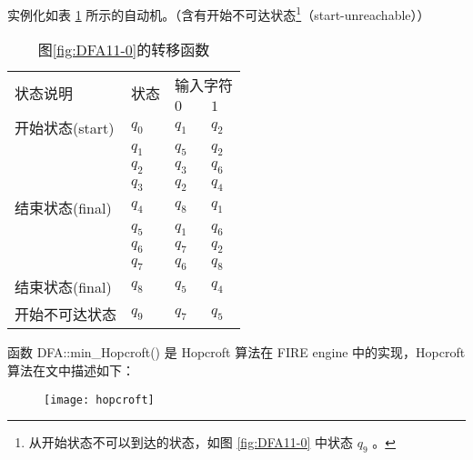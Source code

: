实例化如表 \ref{tab:DFA411-1} 所示的自动机。（含有开始不可达状态\footnote{从开始状态不可以到达的状态，如图 \ref{fig:DFA11-0} 中状态 $q_9$ 。}（start-unreachable））

\begin{table}[!htbp]
    \caption{图\ref{fig:DFA11-0}的转移函数}
    \label{tab:DFA411-1}
    \centering
    \small%
    \setlength{\tabcolsep}{4pt}%
    \renewcommand{\arraystretch}{1.2}%
        \begin{tabular}{l p{4em}<{\centering} p{3em}<{\centering} p{3em}<{\centering}}
        \toprule %
        \multirow{2}{*}{状态说明} & \multirow{2}{*}{状态} & \multicolumn{2}{c}{输入字符} \\
		\cline{3-4}      &    &$0$ & $1$  \\
        \midrule%
        开始状态(start)  & $q_0$ & $q_1$   & $q_2$   \\
                        & $q_1$ & $q_5$   & $q_2$   \\
                        & $q_2$ & $q_3$   & $q_6$   \\
                        & $q_3$ & $q_2$   & $q_4$   \\
        结束状态(final) & $q_4$ & $q_8$   & $q_1$   \\
                        & $q_5$ & $q_1$   & $q_6$   \\
                        & $q_6$ & $q_7$   & $q_2$   \\
                        & $q_7$ & $q_6$   & $q_8$   \\
        结束状态(final) & $q_8$ & $q_5$   & $q_4$   \\
        开始不可达状态    & $q_9$ & $q_7$   & $q_5$   \\
        \bottomrule%
    \end{tabular}
\end{table}

函数 DFA::min\_Hopcroft() 是 Hopcroft 算法在 FIRE engine 中的实现，Hopcroft 算法在文中\cite{watson1993taxonomyb}描述如下：
\begin{figure}[!htbp]
    \centering
        \texttt{[image: hopcroft]}
\end{figure}


